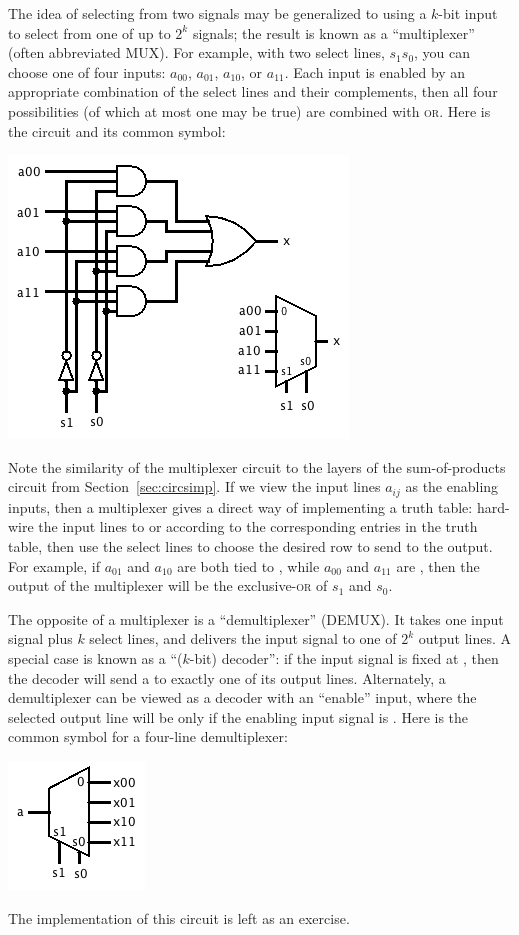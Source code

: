 The idea of selecting from two signals may be generalized to using a $k$-bit input to select from one of up to $2^k$ signals; the result is known as a ``multiplexer'' (often abbreviated MUX). For example, with two select lines, $s_1s_0$, you can choose one of four inputs: $a_{00}$, $a_{01}$, $a_{10}$, or $a_{11}$. Each input is enabled by an appropriate combination of the select lines and their complements, then all four possibilities (of which at most one may be true) are combined with \textsc{or}. Here is the circuit and its common symbol:
\begin{center}
\includegraphics[width=!,height=!,scale=0.75]{graphics/MUX.png}
\end{center}

Note the similarity of the multiplexer circuit to the layers of the sum-of-products circuit from Section~\ref{sec:circsimp}. If we view the input lines $a_{ij}$ as the enabling inputs, then a multiplexer gives a direct way of implementing a truth table: hard-wire the input lines to \0 or \1 according to the corresponding entries in the truth table, then use the select lines to choose the desired row to send to the output. For example, if $a_{01}$ and $a_{10}$ are both tied to \1, while $a_{00}$ and $a_{11}$ are \0, then the output of the multiplexer will be the exclusive-\textsc{or} of $s_1$ and $s_0$.

The opposite of a multiplexer is a ``demultiplexer'' (DEMUX). It takes one input signal plus $k$ select lines, and delivers the input signal to one of $2^k$ output lines. A special case is known as a ``($k$-bit) decoder'': if the input signal is fixed at \1, then the decoder will send a \1 to exactly one of its output lines. Alternately, a demultiplexer can be viewed as a decoder with an ``enable'' input, where the selected output line will be \1 only if the enabling input signal is \1. Here is the common symbol for a four-line demultiplexer:
\begin{center}
\includegraphics[width=!,height=!,scale=0.75]{graphics/DEMUX.png}
\end{center}
The implementation of this circuit is left as an exercise.

